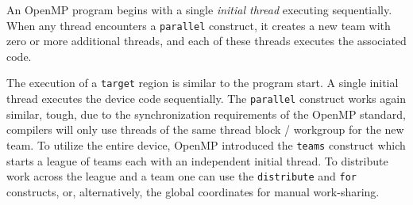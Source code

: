 An OpenMP program begins with a single \emph{initial thread} executing sequentially.
When any thread encounters a \lstinline{parallel} construct, it creates a new team with zero or more additional threads, and each of these threads executes the associated code.

The execution of a \lstinline{target} region is similar to the program start.
A single initial thread executes the device code sequentially.
The \lstinline{parallel} construct works again similar, tough, due to the synchronization requirements of the OpenMP standard, compilers will only use threads of the same thread block / workgroup for the new team.
To utilize the entire device, OpenMP introduced the \lstinline{teams} construct which starts a league of teams each with an independent initial thread.
To distribute work across the league and a team one can use the \lstinline|distribute| and \lstinline|for| constructs, or, alternatively, the global coordinates for manual work-sharing.

